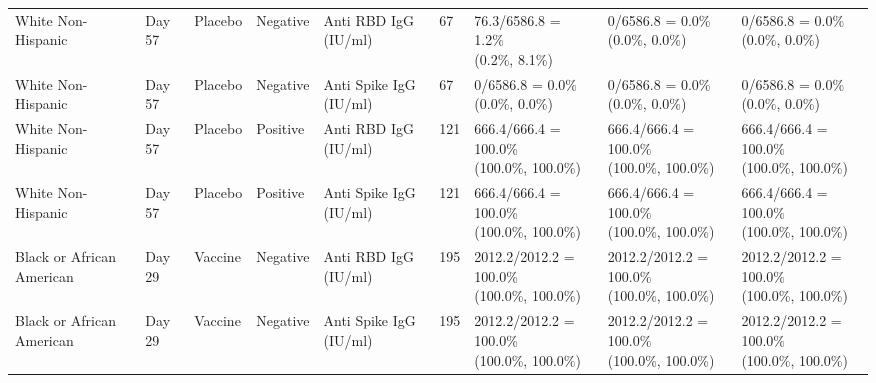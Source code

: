 \documentclass[]{book}
\theoremstyle{definition}
\theoremstyle{definition}
\theoremstyle{definition}
\newcommand{\1}{\mathbbm{1}}
\begin{document}
\begin{landscape}
\begin{ThreePartTable}
\begin{longtable}[t]{>{\raggedright\arraybackslash}p{2.7cm}llllllll}
\hspace{1em}White Non-Hispanic & Day 57 & Placebo & Negative & Anti RBD IgG (IU/ml) & 67 & \makecell[l]{76.3/6586.8 = 1.2\%\\(0.2\%, 8.1\%)} & \makecell[l]{0/6586.8 = 0.0\%\\(0.0\%, 0.0\%)} & \makecell[l]{0/6586.8 = 0.0\%\\(0.0\%, 0.0\%)}\\
\hspace{1em}White Non-Hispanic & Day 57 & Placebo & Negative & Anti Spike IgG (IU/ml) & 67 & \makecell[l]{0/6586.8 = 0.0\%\\(0.0\%, 0.0\%)} & \makecell[l]{0/6586.8 = 0.0\%\\(0.0\%, 0.0\%)} & \makecell[l]{0/6586.8 = 0.0\%\\(0.0\%, 0.0\%)}\\
\hspace{1em}White Non-Hispanic & Day 57 & Placebo & Positive & Anti RBD IgG (IU/ml) & 121 & \makecell[l]{666.4/666.4 = 100.0\%\\(100.0\%, 100.0\%)} & \makecell[l]{666.4/666.4 = 100.0\%\\(100.0\%, 100.0\%)} & \makecell[l]{666.4/666.4 = 100.0\%\\(100.0\%, 100.0\%)}\\
\hspace{1em}White Non-Hispanic & Day 57 & Placebo & Positive & Anti Spike IgG (IU/ml) & 121 & \makecell[l]{666.4/666.4 = 100.0\%\\(100.0\%, 100.0\%)} & \makecell[l]{666.4/666.4 = 100.0\%\\(100.0\%, 100.0\%)} & \makecell[l]{666.4/666.4 = 100.0\%\\(100.0\%, 100.0\%)}\\
\hspace{1em}Black or African American & Day 29 & Vaccine & Negative & Anti RBD IgG (IU/ml) & 195 & \makecell[l]{2012.2/2012.2 = 100.0\%\\(100.0\%, 100.0\%)} & \makecell[l]{2012.2/2012.2 = 100.0\%\\(100.0\%, 100.0\%)} & \makecell[l]{2012.2/2012.2 = 100.0\%\\(100.0\%, 100.0\%)}\\
\hspace{1em}Black or African American & Day 29 & Vaccine & Negative & Anti Spike IgG (IU/ml) & 195 & \makecell[l]{2012.2/2012.2 = 100.0\%\\(100.0\%, 100.0\%)} & \makecell[l]{2012.2/2012.2 = 100.0\%\\(100.0\%, 100.0\%)} & \makecell[l]{2012.2/2012.2 = 100.0\%\\(100.0\%, 100.0\%)}\\

\end{longtable}
\end{ThreePartTable}
\end{landscape}
\end{document}
